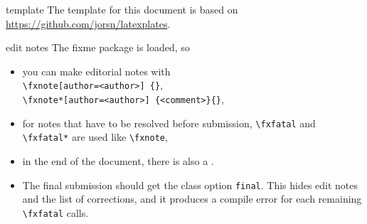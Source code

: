 \begingroup
\def\cmd#1{\texttt{\textbackslash{}#1}}
\begin{anfxnote}[author=\noindent JR]{template}
  The template for this document is based on
  \url{https://github.com/jorsn/latexplates}.
\end{anfxnote}

\begin{anfxwarning}[author=\noindent JR]{edit notes}
  The \textsf{fixme} package is loaded, so
  \begin{itemize}
    \item you can make editorial notes with
      \\
        \texttt{\cmd{fxnote}[author=<author>]%
      \twocol{\\\hbox{}\quad}%
          \{<margin comment>\}},
      \\
        \texttt{\cmd{fxnote*}[author=<author>]%
      \twocol{\\\hbox{}\quad}%
          \{<comment>\}\{<text to highlight>\}},

  \item
    for notes that have to be resolved before submission,
    \cmd{fxfatal} and \cmd{fxfatal*} are used like \cmd{fxnote},

  \item
    in the end of the document, there is also a \MakeLowercase\englishlistfixmename .

  \item
    The final submission should get the class option \texttt{final}. This hides
    edit notes and the list of corrections, and it produces a compile error for
    each remaining \cmd{fxfatal} calls.
\end{itemize}
\end{anfxwarning}
\endgroup


